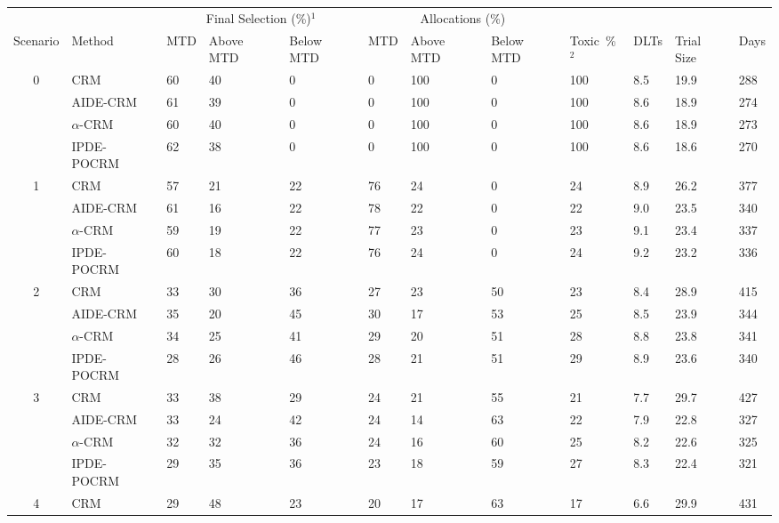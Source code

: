 \begin{tabular*}{\textwidth}{@{\extracolsep\fill}clllllllllll@{\extracolsep\fill}}
\toprule
&  & \multicolumn{3}{c}{Final Selection (\%)$^1$} & \multicolumn{3}{c}{Allocations (\%)} & &  &  &  \\
\multirow{2}{2em}{Scenario} & \multirow{2}{2em}{Method} & \multirow{2}{2em}{MTD} & \multirow{2}{2em}{Above MTD} & \multirow{2}{2em}{Below MTD} & \multirow{2}{2em}{MTD} & \multirow{2}{2em}{Above MTD} & \multirow{2}{2em}{Below MTD} & \multirow{2}{2em}{Toxic~\%$^2$} & \multirow{2}{2em}{DLTs} & \multirow{2}{2em}{Trial Size} & \multirow{2}{2em}{Days}  \\ \\ 
\midrule
\multirow{4}{2em}{0} & CRM & 60 & 40 & 0 & 0 & 100 & 0 & 100 & 8.5 & 19.9 & 288\\
 & AIDE-CRM & 61 & 39 & 0 & 0 & 100 & 0 & 100 & 8.6 & 18.9 & 274\\
 & $\alpha$-CRM & 60 & 40 & 0 & 0 & 100 & 0 & 100 & 8.6 & 18.9 & 273\\
 & IPDE-POCRM & 62 & 38 & 0 & 0 & 100 & 0 & 100 & 8.6 & 18.6 & 270\\
\midrule
\multirow{4}{2em}{1} & CRM & 57 & 21 & 22 & 76 & 24 & 0 & 24 & 8.9 & 26.2 & 377\\
 & AIDE-CRM & 61 & 16 & 22 & 78 & 22 & 0 & 22 & 9.0 & 23.5 & 340\\
 & $\alpha$-CRM & 59 & 19 & 22 & 77 & 23 & 0 & 23 & 9.1 & 23.4 & 337\\
 & IPDE-POCRM & 60 & 18 & 22 & 76 & 24 & 0 & 24 & 9.2 & 23.2 & 336\\
\midrule
\multirow{4}{2em}{2} & CRM & 33 & 30 & 36 & 27 & 23 & 50 & 23 & 8.4 & 28.9 & 415\\
 & AIDE-CRM & 35 & 20 & 45 & 30 & 17 & 53 & 25 & 8.5 & 23.9 & 344\\
 & $\alpha$-CRM & 34 & 25 & 41 & 29 & 20 & 51 & 28 & 8.8 & 23.8 & 341\\
 & IPDE-POCRM & 28 & 26 & 46 & 28 & 21 & 51 & 29 & 8.9 & 23.6 & 340\\
\midrule
\multirow{4}{2em}{3} & CRM & 33 & 38 & 29 & 24 & 21 & 55 & 21 & 7.7 & 29.7 & 427\\
 & AIDE-CRM & 33 & 24 & 42 & 24 & 14 & 63 & 22 & 7.9 & 22.8 & 327\\
 & $\alpha$-CRM & 32 & 32 & 36 & 24 & 16 & 60 & 25 & 8.2 & 22.6 & 325\\
 & IPDE-POCRM & 29 & 35 & 36 & 23 & 18 & 59 & 27 & 8.3 & 22.4 & 321\\
\midrule
\multirow{4}{2em}{4} & CRM & 29 & 48 & 23 & 20 & 17 & 63 & 17 & 6.6 & 29.9 & 431\\

\end{tabular*}
